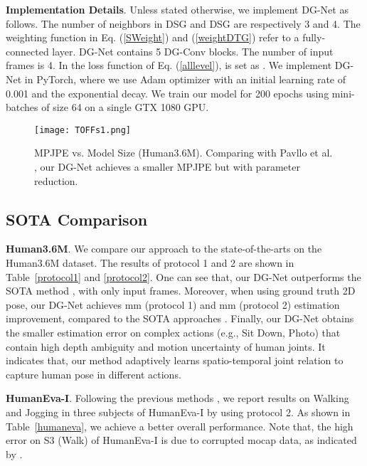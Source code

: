 \documentclass[journal]{IEEEtran}
\begin{document}
\textbf{Implementation Details}.
Unless stated otherwise,
we implement DG-Net as follows.
The number of neighbors  in DSG and DSG are respectively 3 and 4.
The weighting function in Eq. (\ref{SWeight}) and (\ref{weightDTG}) refer to a fully-connected layer.
DG-Net contains 5 DG-Conv blocks.
The number of input frames is 4.
In the loss function of Eq. (\ref{alllevel}),
 is set as .
We implement DG-Net in PyTorch,
where
we use Adam optimizer with an initial learning rate of 0.001 and the exponential decay. We train our model for 200 epochs using mini-batches of size 64 on a single GTX 1080 GPU.


\begin{figure}[t]
\centering
\texttt{[image: TOFFs1.png]}
\caption{MPJPE vs. Model Size (Human3.6M).
Comparing with Pavllo et al. \cite{pavllo:videopose3d:2019},
our DG-Net achieves a smaller MPJPE but with  parameter reduction.}
\label{TOFFs}
\end{figure}

\subsection{SOTA Comparison}

\textbf{Human3.6M}.
We compare our approach to the state-of-the-arts on the Human3.6M dataset.
The results of protocol 1 and 2 are shown in Table~\ref{protocol1} and \ref{protocol2}.
One can see that,
our DG-Net outperforms the SOTA method \cite{pavllo:videopose3d:2019},
with only  input frames.
Moreover,
when using ground truth 2D pose,
our DG-Net achieves  mm (protocol 1) and  mm (protocol 2) estimation improvement,
compared to the SOTA approaches \cite{Ci_2019_ICCV,Liu_2020_CVPR}.
Finally,
our DG-Net obtains the smaller estimation error on complex actions (e.g., Sit Down, Photo) that contain high depth ambiguity and motion uncertainty of human joints.
It indicates that,
our method adaptively learns spatio-temporal joint relation to capture human pose in different actions.


\textbf{HumanEva-I}.
Following the previous methods \cite{Yasin_2016_CVPR,Lin_2017_CVPR,distance,volumetric,simple,rnnpose,eccv2018temporal,pavllo:videopose3d:2019},
we report results on Walking and Jogging in three subjects of HumanEva-I by using protocol 2.
As shown in Table~\ref{humaneva},
we achieve a better overall performance.
Note that,
the high error on S3 (Walk) of HumanEva-I is due to corrupted mocap data,
as indicated by \cite{pavllo:videopose3d:2019}.
\end{document}
